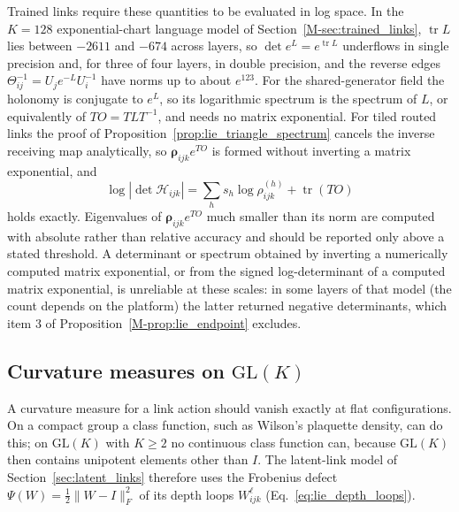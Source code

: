 \documentclass[twoside,11pt]{article}
\begin{document}
Trained links require these quantities to be evaluated in log space. In the $K=128$ exponential-chart language model of Section~\ref{M-sec:trained_links}, $\operatorname{tr}L$ lies between $-2611$ and $-674$ across layers, so $\det e^{L}=e^{\operatorname{tr}L}$ underflows in single precision and, for three of four layers, in double precision, and the reverse edges $\Theta_{ij}^{-1}=U_je^{-L}U_i^{-1}$ have norms up to about $e^{123}$. For the shared-generator field the holonomy is conjugate to $e^{L}$, so its logarithmic spectrum is the spectrum of $L$, or equivalently of $TO=TLT^{-1}$, and needs no matrix exponential. For tiled routed links the proof of Proposition~\ref{prop:lie_triangle_spectrum} cancels the inverse receiving map analytically, so $\boldsymbol\rho_{ijk}e^{TO}$ is formed without inverting a matrix exponential, and
\begin{equation}
\log|\det\mathcal H_{ijk}|=\sum_hs_h\log\rho_{ijk}^{(h)}+\operatorname{tr}(TO)
\label{eq:lie_triangle_logdet}
\end{equation}
holds exactly. Eigenvalues of $\boldsymbol\rho_{ijk}e^{TO}$ much smaller than its norm are computed with absolute rather than relative accuracy and should be reported only above a stated threshold. A determinant or spectrum obtained by inverting a numerically computed matrix exponential, or from the signed log-determinant of a computed matrix exponential, is unreliable at these scales: in some layers of that model (the count depends on the platform) the latter returned negative determinants, which item 3 of Proposition~\ref{M-prop:lie_endpoint} excludes.

\subsection{Curvature measures on \texorpdfstring{$\mathrm{GL}(K)$}{GL(K)}}
\label{supp:curvature_measures}

A curvature measure for a link action should vanish exactly at flat configurations. On a compact group a class function, such as Wilson's plaquette density, can do this; on $\mathrm{GL}(K)$ with $K\ge2$ no continuous class function can, because $\mathrm{GL}(K)$ then contains unipotent elements other than $I$. The latent-link model of Section~\ref{sec:latent_links} therefore uses the Frobenius defect $\Psi(W)=\tfrac12\|W-I\|_F^2$ of its depth loops $W_{ijk}^\ell$ (Eq.~\eqref{eq:lie_depth_loops}).
\end{document}
